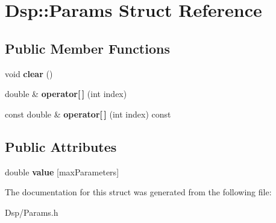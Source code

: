 \hypertarget{structDsp_1_1Params}{\section{Dsp\-:\-:Params Struct Reference}
\label{structDsp_1_1Params}
}
\subsection*{Public Member Functions}
\begin{DoxyCompactItemize}
\item 
\hypertarget{structDsp_1_1Params_a2a9ef122dc17c145ad3a43d91d42e2ce}{void {\bfseries clear} ()}\label{structDsp_1_1Params_a2a9ef122dc17c145ad3a43d91d42e2ce}

\item 
\hypertarget{structDsp_1_1Params_a43a241017287b64ebf91d06e2acef462}{double \& {\bfseries operator\mbox{[}$\,$\mbox{]}} (int index)}\label{structDsp_1_1Params_a43a241017287b64ebf91d06e2acef462}

\item 
\hypertarget{structDsp_1_1Params_a4781ca58ca93d913b69495f8e17bb370}{const double \& {\bfseries operator\mbox{[}$\,$\mbox{]}} (int index) const }\label{structDsp_1_1Params_a4781ca58ca93d913b69495f8e17bb370}

\end{DoxyCompactItemize}
\subsection*{Public Attributes}
\begin{DoxyCompactItemize}
\item 
\hypertarget{structDsp_1_1Params_a4cd5cbc46cb2139a3d0273a2d1629753}{double {\bfseries value} \mbox{[}max\-Parameters\mbox{]}}\label{structDsp_1_1Params_a4cd5cbc46cb2139a3d0273a2d1629753}

\end{DoxyCompactItemize}


The documentation for this struct was generated from the following file\-:\begin{DoxyCompactItemize}
\item 
Dsp/Params.\-h\end{DoxyCompactItemize}
